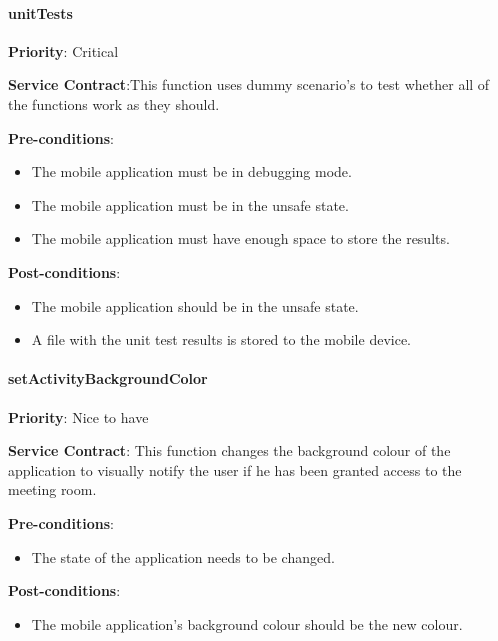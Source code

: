 		\paragraph{unitTests}
			\begin{description}
			    \item{\textbf{Priority}:} Critical %
			    \item{\textbf{Service Contract}:}This function uses dummy scenario's to test whether all of the functions work as they should.%
			    \item{\textbf{Pre-conditions}:}%
    			    \begin{itemize}
    			        \item The mobile application must be in debugging mode.
    			        \item The mobile application must be in the unsafe state.
    			        \item The mobile application must have enough space to store the results.
    			    \end{itemize}
			    \item{\textbf{Post-conditions}:} %
    			    \begin{itemize}
    			    \item The mobile application should be in the unsafe state.
    			    \item A file with the unit test results is stored to the mobile device.
    			    \end{itemize}
			\end{description}

				
		\paragraph{setActivityBackgroundColor}
			\begin{description}
			    \item{\textbf{Priority}:} Nice to have%
			    \item{\textbf{Service Contract}:} This function changes the background colour of the application to visually notify the user if he has been granted access to the meeting room.%
			    \item{\textbf{Pre-conditions}:}%
    			    \begin{itemize}
    			        \item The state of the application needs to be changed.
    			    \end{itemize}
			    \item{\textbf{Post-conditions}:} %
    			    \begin{itemize}
    			    \item The mobile application's background colour should be the new colour.
    			    \end{itemize}
			\end{description}
			
